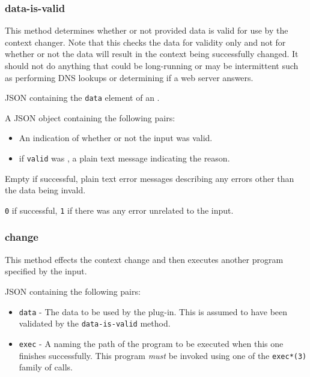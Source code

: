 \documentclass[10pt,titlepage]{article}
\begin{document}
\subsubsection{data-is-valid}

This method determines whether or not provided data is valid for use
by the context changer.  Note that this checks the data for validity
only and not for whether or not the data will result in the context
being successfully changed.  It should not do anything that could be
long-running or may be intermittent such as performing DNS lookups or
determining if a web server answers.

 JSON containing the {\tt data} element of
an .

 A JSON object containing the following pairs:

\begin{itemize}
\item {} An indication of whether or not the
  input was valid.

\item {} if {\tt valid} was \false, a plain
  text message indicating the reason.
\end{itemize}

 Empty if successful, plain text error
messages describing any errors other than the data being invald.

 {\tt 0} if successful, {\tt 1} if there was
any error unrelated to the input.


\subsubsection{change}

This method effects the context change and then executes another
program specified by the input.

 JSON containing the following pairs:
\begin{itemize}
\item{\tt data} - The data to be used by the plug-in.  This is assumed
  to have been validated by the {\tt data-is-valid} method.
\item{\tt exec} - A  naming the path of the program
  to be executed when this one finishes successfully.  This program
  {\em must} be invoked using one of the {\tt exec*(3)} family of
  calls.
\end{itemize}
\end{document}
